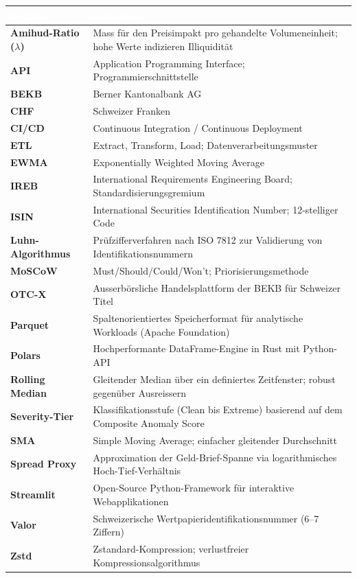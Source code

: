 \documentclass[12pt, a4paper, oneside]{report}
\begin{document}
\begin{table}[H]
\centering
{}
\begin{tabularx}{\textwidth}{>{\bfseries\sffamily}p{3.5cm} X}
  \toprule
  \rowcolor{darknavy} \textcolor{white}{Begriff} & \textcolor{white}{Definition} \\
  \midrule
  Amihud-Ratio ($\lambda$) & Mass f\"ur den Preisimpakt pro gehandelte Volumeneinheit; hohe Werte indizieren Illiquidit\"at \\
  API           & Application Programming Interface; Programmierschnittstelle \\
  BEKB          & Berner Kantonalbank AG \\
  CHF           & Schweizer Franken \\
  CI/CD         & Continuous Integration / Continuous Deployment \\
  ETL           & Extract, Transform, Load; Datenverarbeitungsmuster \\
  EWMA          & Exponentially Weighted Moving Average \\
  IREB          & International Requirements Engineering Board; Standardisierungsgremium \\
  ISIN          & International Securities Identification Number; 12-stelliger Code \\
  Luhn-Algorithmus & Pr\"ufzifferverfahren nach ISO 7812 zur Validierung von Identifikationsnummern \\
  MoSCoW        & Must/Should/Could/Won't; Priorisierungsmethode \\
  OTC-X         & Ausserb\"orsliche Handelsplattform der BEKB f\"ur Schweizer Titel \\
  Parquet       & Spaltenorientiertes Speicherformat f\"ur analytische Workloads (Apache Foundation) \\
  Polars        & Hochperformante DataFrame-Engine in Rust mit Python-API \\
  Rolling Median & Gleitender Median \"uber ein definiertes Zeitfenster; robust gegen\"uber Ausreissern \\
  Severity-Tier & Klassifikationsstufe (Clean bis Extreme) basierend auf dem Composite Anomaly Score \\
  SMA           & Simple Moving Average; einfacher gleitender Durchschnitt \\
  Spread Proxy  & Approximation der Geld-Brief-Spanne via logarithmisches Hoch-Tief-Verh\"altnis \\
  Streamlit     & Open-Source Python-Framework f\"ur interaktive Webapplikationen \\
  Valor         & Schweizerische Wertpapieridentifikationsnummer (6--7 Ziffern) \\
  Zstd          & Zstandard-Kompression; verlustfreier Kompressionsalgorithmus \\
  \bottomrule
\end{tabularx}
\end{table}
\end{document}
